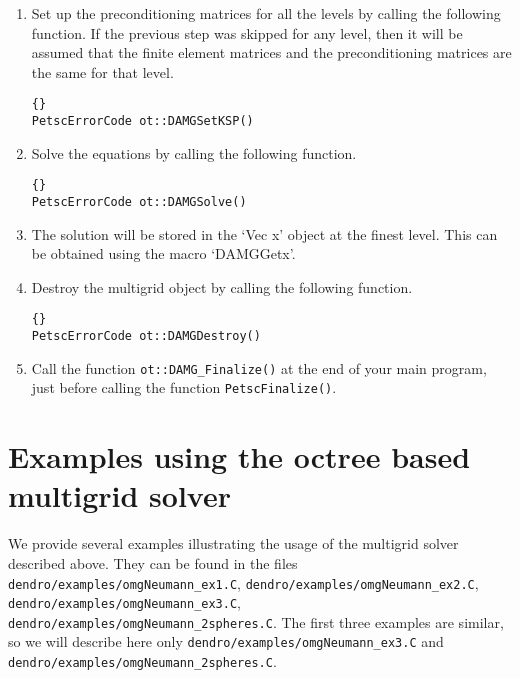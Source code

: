 \documentclass[12pt,reqno,a4paper]{report}
\numberwithin{equation}{section}
\begin{document}
\begin{enumerate}
\item Set up the preconditioning matrices for all the levels by calling the following function. If the previous step was skipped for any level, then it will be assumed that the finite element matrices and the preconditioning matrices are the same for that level.

\begin{lstlisting}[frame=trbl]{}
PetscErrorCode ot::DAMGSetKSP()
\end{lstlisting}

\item Solve the equations by calling the following function.

\begin{lstlisting}[frame=trbl]{}
PetscErrorCode ot::DAMGSolve()
\end{lstlisting}

\item The solution will be stored in the `Vec x' object at the finest level. This can be obtained using the macro `DAMGGetx'.
  
\item Destroy the multigrid object by calling the following function.

\begin{lstlisting}[frame=trbl]{}
PetscErrorCode ot::DAMGDestroy()
\end{lstlisting}

\item Call the function \lstinline[basicstyle=\bfseries]!ot::DAMG_Finalize()! at the end of your main program, just before calling the function  \lstinline[basicstyle=\bfseries]!PetscFinalize()!.

\end{enumerate}


\section{Examples using the octree based multigrid solver}
\label{sec:examples}
We provide several examples illustrating the usage of the multigrid solver described above. They can be found in the files
\verb'dendro/examples/omgNeumann_ex1.C', 
\verb'dendro/examples/omgNeumann_ex2.C',
\verb'dendro/examples/omgNeumann_ex3.C',
\verb'dendro/examples/omgNeumann_2spheres.C'.
The first three examples are similar, so we will describe here only  \verb'dendro/examples/omgNeumann_ex3.C' and \verb'dendro/examples/omgNeumann_2spheres.C'.
\end{document}
